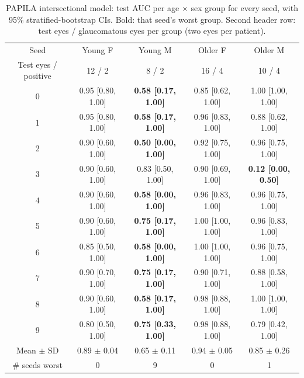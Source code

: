 \begin{table}[t]
\centering
\caption{PAPILA intersectional model: test AUC per age $\times$ sex group for every seed, with 95\% stratified-bootstrap CIs. Bold: that seed's worst group. Second header row: test eyes / glaucomatous eyes per group (two eyes per patient).}
\label{tab:papila}
\small
\begin{tabular}{ccccc}
\toprule
Seed & Young F & Young M & Older F & Older M \\
Test eyes / positive & 12 / 2 & 8 / 2 & 16 / 4 & 10 / 4 \\
\midrule
0 & 0.95 [0.80, 1.00] & \textbf{0.58 [0.17, 1.00]} & 0.85 [0.62, 1.00] & 1.00 [1.00, 1.00] \\
1 & 0.95 [0.80, 1.00] & \textbf{0.58 [0.17, 1.00]} & 0.96 [0.83, 1.00] & 0.88 [0.62, 1.00] \\
2 & 0.90 [0.60, 1.00] & \textbf{0.50 [0.00, 1.00]} & 0.92 [0.75, 1.00] & 0.96 [0.75, 1.00] \\
3 & 0.90 [0.60, 1.00] & 0.83 [0.50, 1.00] & 0.90 [0.69, 1.00] & \textbf{0.12 [0.00, 0.50]} \\
4 & 0.90 [0.60, 1.00] & \textbf{0.58 [0.00, 1.00]} & 0.96 [0.83, 1.00] & 0.96 [0.75, 1.00] \\
5 & 0.90 [0.60, 1.00] & \textbf{0.75 [0.17, 1.00]} & 1.00 [1.00, 1.00] & 0.96 [0.83, 1.00] \\
6 & 0.85 [0.50, 1.00] & \textbf{0.58 [0.00, 1.00]} & 1.00 [1.00, 1.00] & 0.96 [0.75, 1.00] \\
7 & 0.90 [0.70, 1.00] & \textbf{0.75 [0.17, 1.00]} & 0.90 [0.71, 1.00] & 0.88 [0.58, 1.00] \\
8 & 0.90 [0.60, 1.00] & \textbf{0.58 [0.17, 1.00]} & 0.98 [0.88, 1.00] & 1.00 [1.00, 1.00] \\
9 & 0.80 [0.50, 1.00] & \textbf{0.75 [0.33, 1.00]} & 0.98 [0.88, 1.00] & 0.79 [0.42, 1.00] \\
\midrule
Mean $\pm$ SD & 0.89 $\pm$ 0.04 & 0.65 $\pm$ 0.11 & 0.94 $\pm$ 0.05 & 0.85 $\pm$ 0.26 \\
\# seeds worst & 0 & 9 & 0 & 1 \\
\bottomrule
\end{tabular}
\end{table}
